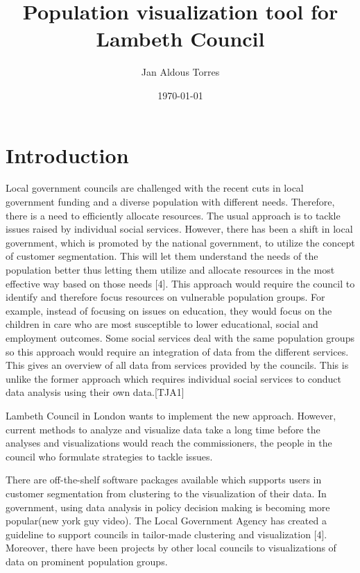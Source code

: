 \documentclass[11pt]{informatics-report}
\title{Population visualization tool for Lambeth Council}
\author{Jan Aldous Torres}
\date{\today}
\begin{document}
\createFrontMatter
\onehalfspacing
\tableofcontents
\listoffigures
\doublespacing


\chapter{Introduction}
\cite{_developing_classification}
\cite{kent_midway}
\cite{boden_detecting_2013}
\cite{conway_data_2014}
\cite{customer_segmentaion}
\cite{graves_visualization_2013}
\cite{smart_cities}
\cite{acorn_user_guide}
\cite{gogolou_data_2016}
\cite{lga_guide}
\cite{experian}

Local government councils are challenged with the recent cuts in local government funding and a diverse population with different needs. Therefore, there is a need to efficiently allocate resources. The usual approach is to tackle issues raised by individual social services. However, there has been a shift in local government, which is promoted by the national government, to utilize the concept of customer segmentation. This will let them understand the needs of the population better thus letting them utilize and allocate resources in the most effective way based on those needs [4]. This approach would require the council to identify and therefore focus resources on vulnerable population groups. For example, instead of focusing on issues on education, they would focus on the children in care who are most susceptible to lower educational, social and employment outcomes. Some social services deal with the same population groups so this approach would require an integration of data from the different services. This gives an overview of all data from services provided by the councils. This is unlike the former approach which requires individual social services to conduct data analysis using their own data.[TJA1] \par

Lambeth Council in London wants to implement the new approach. However, current methods to analyze and visualize data take a long time before the analyses and visualizations would reach the commissioners, the people in the council who formulate strategies to tackle issues.\par
 
There are off-the-shelf software packages available which supports users in customer segmentation from clustering to the visualization of their data. In government, using data analysis in policy decision making is becoming more popular(new york guy video). The Local Government Agency has created a guideline to support councils in tailor-made clustering and visualization [4]. Moreover, there have been projects by other local councils to visualizations of data on prominent population groups. \par
\end{document}
